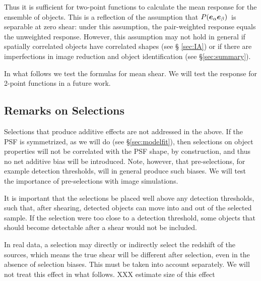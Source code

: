 \documentclass[iop]{emulateapj}
\newcommand{\vest}{\mbox{\boldmath $e$}}
\newcommand{\mcalRscalarmean}{\mbox{$\langle R \rangle$}}
\newcommand{\probe}{\mbox{$P(\vest_\alpha \vest_\beta)$}}
\begin{document}
Thus it is sufficient for two-point functions to calculate the mean response
for the ensemble of objects.  This is a reflection of the assumption that
\probe\ is separable at zero shear: under this assumption, the pair-weighted
response equals the unweighted response.  However, this assumption may not hold
in general if spatially correlated objects have correlated shapes (see \S
\ref{sec:IA}) or if there are imperfections in image reduction and object
identification (see \S \ref{sec:summary}).


In what follows we test the formulas for mean shear.  We will test the
response for 2-point functions in a future work.

\subsection{Remarks on Selections}

Selections that produce additive effects are not addressed in the above.  If
the PSF is symmetrized, as we will do (see \S \ref{sec:modelfit}), then
selections on object properties will not be correlated with the PSF shape, by
construction, and thus no net additive bias will be introduced. Note, however,
that pre-selections, for example detection thresholds, will in general produce
such biases.  We will test the importance of pre-selections with image
simulations.


It is important that the selections be placed well above any detection
thresholds, such that, after shearing, detected objects can move into and out
of the selected sample.  If the selection were too close to a detection
threshold, some objects that should become detectable after
a shear would not be included.

In real data, a selection may directly or indirectly select the redshift of the
sources, which means the true shear will be different after selection, even in
the absence of selection biases.  This must be taken into account separately.
We will not treat this effect in what follows.  XXX estimate size of this
effect
\end{document}
